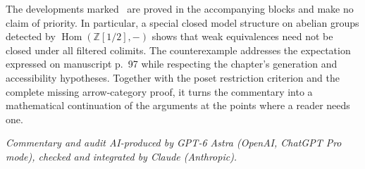 The developments marked \ours\ are proved in the accompanying blocks and make no claim of priority. In particular, a special closed model structure on abelian groups detected by $\operatorname{Hom}(\mathbb Z[1/2],-)$ shows that weak equivalences need not be closed under all filtered colimits. The counterexample addresses the expectation expressed on manuscript p.~97 while respecting the chapter's generation and accessibility hypotheses. Together with the poset restriction criterion and the complete missing arrow-category proof, it turns the commentary into a mathematical continuation of the arguments at the points where a reader needs one.

\medskip\noindent\emph{Commentary and audit AI-produced by GPT-6 Astra (OpenAI, ChatGPT Pro mode), checked and integrated by Claude (Anthropic).}
\nocite{*}
